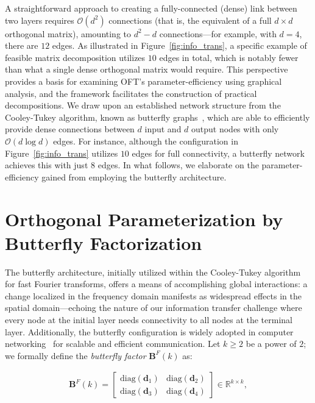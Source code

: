 A straightforward approach to creating a fully-connected (dense) link between two layers requires $\mathcal{O}(d^2)$ connections (that is, the equivalent of a full $d \times d$ orthogonal matrix), amounting to $d^2-d$ connections—for example, with $d=4$, there are $12$ edges. As illustrated in Figure~\ref{fig:info_trans}, a specific example of feasible matrix decomposition utilizes $10$ edges in total, which is notably fewer than what a single dense orthogonal matrix would require. This perspective provides a basis for examining OFT’s parameter-efficiency using graphical analysis, and the framework facilitates the construction of practical decompositions. We draw upon an established network structure from the Cooley-Tukey algorithm, known as butterfly graphs~\cite{cooley1965algorithm}, which are able to efficiently provide dense connections between $d$ input and $d$ output nodes with only $\mathcal{O}(d\log d)$ edges. For instance, although the configuration in Figure~\ref{fig:info_trans} utilizes $10$ edges for full connectivity, a butterfly network achieves this with just $8$ edges. In what follows, we elaborate on the parameter-efficiency gained from employing the butterfly architecture.

\section{Orthogonal Parameterization by Butterfly Factorization}

The butterfly architecture, initially utilized within the Cooley-Tukey algorithm for fast Fourier transforms, offers a means of accomplishing global interactions: a change localized in the frequency domain manifests as widespread effects in the spatial domain—echoing the nature of our information transfer challenge where every node at the initial layer needs connectivity to all nodes at the terminal layer. Additionally, the butterfly configuration is widely adopted in computer networking~\cite{solihin2015fundamentals,li2011linear} for scalable and efficient communication. Let $k\geq 2$ be a power of $2$; we formally define the \emph{butterfly factor} $\bm{B}^F(k)$ as:

\begin{equation}\label{eq:but_factor}
\begin{aligned}
    \bm{B}^F(k)=\begin{bmatrix}
    \text{diag}(\bm{d}_1) & \text{diag}(\bm{d}_2) \\
    \text{diag}(\bm{d}_3) & \text{diag}(\bm{d}_4)
    \end{bmatrix}\in\mathbb{R}^{k\times k},
\end{aligned}
\end{equation}

